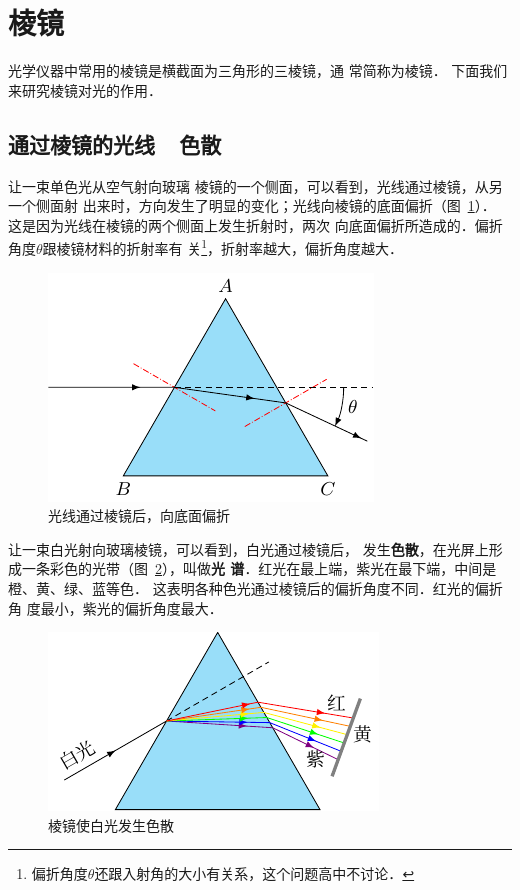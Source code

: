 \section{棱镜}

光学仪器中常用的棱镜是横截面为三角形的三棱镜，通
常简称为棱镜．
下面我们来研究棱镜对光的作用．

\subsection{通过棱镜的光线~~色散}

让一束单色光从空气射向玻璃
棱镜的一个侧面，可以看到，光线通过棱镜，从另一个侧面射
出来时，方向发生了明显的变化；光线向棱镜的底面偏折（图~\ref{fig_C_5-31}）．
这是因为光线在棱镜的两个侧面上发生折射时，两次
向底面偏折所造成的．偏折角度$\theta$跟棱镜材料的折射率有
关\footnote{偏折角度$\theta$还跟入射角的大小有关系，这个问题高中不讨论．}，折射率越大，偏折角度越大．
\begin{figure}[htbp]
    \centering
    \includegraphics{fig/C/5-31.pdf}
    \caption{光线通过棱镜后，向底面偏折}\label{fig_C_5-31}
\end{figure}

让一束白光射向玻璃棱镜，可以看到，白光通过棱镜后，
发生\textbf{色散}，在光屏上形成一条彩色的光带（图~\ref{fig_C_5-32}），叫做\textbf{光
谱}．红光在最上端，紫光在最下端，中间是橙、黄、绿、蓝等色．
这表明各种色光通过棱镜后的偏折角度不同．红光的偏折角
度最小，紫光的偏折角度最大．
\begin{figure}[htbp]
    \centering
    \includegraphics{fig/C/5-32.pdf}
    \caption{棱镜使白光发生色散}\label{fig_C_5-32}
\end{figure}

